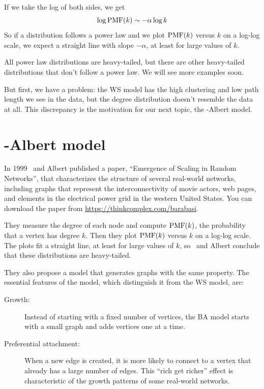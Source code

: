\documentclass[12pt]{book}
\theoremstyle{exercise}
\begin{document}
If we take the log of both sides, we get
%
\[ \log \mathrm{PMF}(k) \sim -\alpha \log k \]
%
So if a distribution follows a power law and we plot $\mathrm{PMF}(k)$ versus
$k$ on a log-log scale, we expect a straight line with slope
$-\alpha$, at least for large values of $k$.

All power law distributions are heavy-tailed, but there are other
heavy-tailed distributions that don't follow a power law.  We will
see more examples soon.

But first, we have a problem: the WS model has the high clustering
and low path length we see in the data, but the degree distribution
doesn't resemble the data at all.  This discrepancy is the motivation
for our next topic, the \Barabasi-Albert model.


\section{\Barabasi-Albert model}
\label{scale.free}

In 1999 \Barabasi~and Albert published a paper,
``Emergence of Scaling in Random Networks'', that characterizes the
structure of several real-world networks,
including graphs that represent the interconnectivity of movie actors,
web pages, and elements in the electrical power grid
in the western United States.  You can download the paper from
\url{https://thinkcomplex.com/barabasi}.


They measure the degree of each node and compute $\mathrm{PMF}(k)$, the
probability that a vertex has degree $k$.  Then they plot $\mathrm{PMF}(k)$
versus $k$ on a log-log scale.  The plots fit a
straight line, at least for large values of $k$,
so \Barabasi~and Albert conclude that these
distributions are heavy-tailed.

They also propose a model that generates graphs with the same
property.  The essential features of the model, which distinguish it
from the WS model, are:


\begin{description}

\item[Growth:]  Instead of starting with a fixed number of vertices,
the BA model starts with a small graph and adds vertices one at a time.

\item[Preferential attachment:] When a new edge is created, it is
more likely to connect to a vertex that already has a large number
of edges.  This ``rich get richer'' effect is characteristic of
the growth patterns of some real-world networks.


\end{description}
\end{document}
